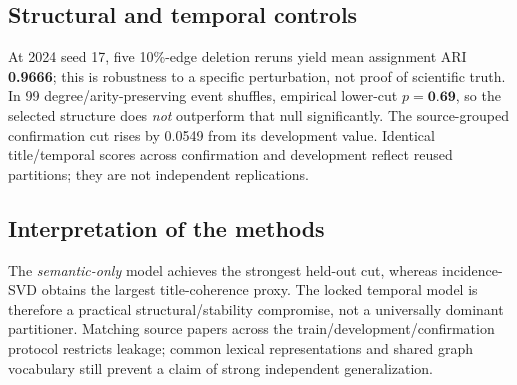 \documentclass[10pt,twocolumn]{article}
\begin{document}
\subsection{Structural and temporal controls}
At 2024 seed 17, five 10\%-edge deletion reruns yield mean assignment ARI \textbf{0.9666}; this is robustness to a specific perturbation, not proof of scientific truth. In 99 degree/arity-preserving event shuffles, empirical lower-cut \(p=\textbf{0.69}\), so the selected structure does \emph{not} outperform that null significantly. The source-grouped confirmation cut rises by 0.0549 from its development value. Identical title/temporal scores across confirmation and development reflect reused partitions; they are not independent replications.
\subsection{Interpretation of the methods}
The \emph{semantic-only} model achieves the strongest held-out cut, whereas incidence-SVD obtains the largest title-coherence proxy. The locked temporal model is therefore a practical structural/stability compromise, not a universally dominant partitioner. Matching source papers across the train/development/confirmation protocol restricts leakage; common lexical representations and shared graph vocabulary still prevent a claim of strong independent generalization.
\end{document}

